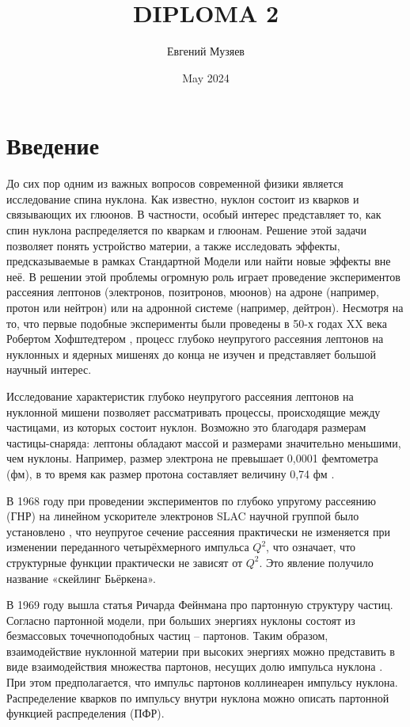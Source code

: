 \documentclass{extarticle}
\title{DIPLOMA 2}
\author{Евгений Музяев}
\date{May 2024}
\begin{document}



\newpage
\tableofcontents
\setcounter{page}{4}
\thispagestyle{headings}
\newpage


\section*{Введение}

До сих пор одним из важных вопросов современной физики является исследование спина нуклона. Как известно, нуклон состоит из кварков и связывающих их глюонов. В частности, особый интерес представляет то, как спин нуклона распределяется по кваркам и глюонам. Решение этой задачи позволяет понять устройство материи, а также исследовать эффекты, предсказываемые в рамках Стандартной Модели или найти новые эффекты вне неё. В решении этой проблемы огромную роль играет проведение экспериментов рассеяния лептонов (электронов, позитронов, мюонов) на адроне (например, протон или нейтрон) или на адронной системе (например, дейтрон). Несмотря на то, что первые подобные эксперименты были проведены в 50-х годах XX века Робертом Хофштедтером \cite{Hofstadter}, процесс глубоко неупругого рассеяния лептонов на нуклонных и ядерных мишенях до конца не изучен и представляет большой научный интерес.


Исследование характеристик глубоко неупругого рассеяния лептонов на нуклонной мишени позволяет рассматривать процессы, происходящие между частицами, из которых состоит нуклон. Возможно это благодаря размерам частицы-снаряда: лептоны обладают массой и размерами значительно меньшими, чем нуклоны. Например, размер электрона не превышает 0,0001 фемтометра (фм), в то время как размер протона составляет величину 0,74 фм \cite{Hofstadter}.


В 1968 году при проведении экспериментов по глубоко упругому рассеянию (ГНР) на линейном ускорителе электронов SLAC научной группой было установлено \cite{SLAC}, что неупругое сечение рассеяния практически не изменяется при изменении переданного четырёхмерного импульса $Q^2$, что означает, что структурные функции практически не зависят от $Q^2$. Это явление получило название «скейлинг Бьёркена».


В 1969 году вышла статья Ричарда Фейнмана про партонную структуру частиц. Согласно партонной модели, при больших энергиях нуклоны состоят из безмассовых точечноподобных частиц – партонов. Таким образом, взаимодействие нуклонной материи при высоких энергиях можно представить в виде взаимодействия множества партонов, несущих долю импульса нуклона \cite{Feynman}. При этом предполагается, что импульс партонов коллинеарен импульсу нуклона. Распределение кварков по импульсу внутри нуклона можно описать партонной функцией распределения (ПФР).
\end{document}
